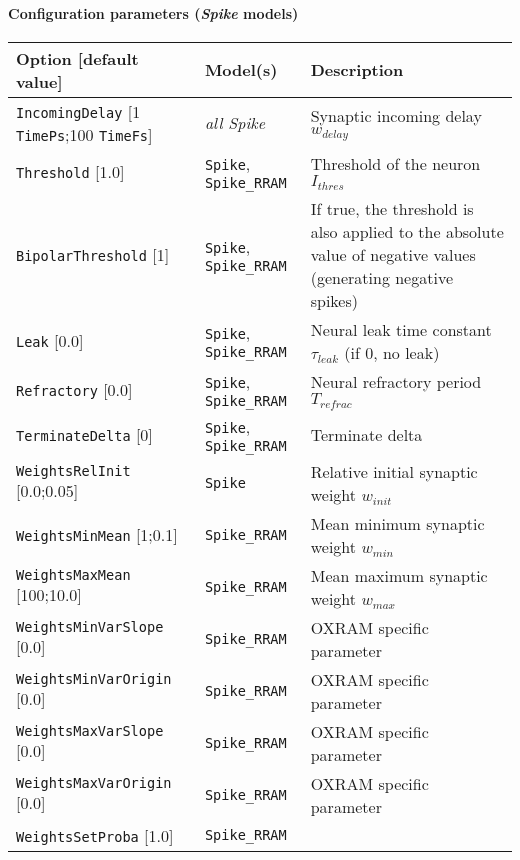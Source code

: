 \documentclass[a4paper,11pt,oneside]{article}
\begin{document}
\paragraph{Configuration parameters (\emph{Spike} models)}

\begin{center}
 \begin{longtable}{| p{4cm} | p{3cm} | p{9cm} | }
 \hline
 Option [default value] & Model(s) & Description\\
 \hline\hline
  \lstinline!IncomingDelay! [1 \lstinline!TimePs!;100 \lstinline!TimeFs!]
    & \emph{all Spike} & Synaptic incoming delay $w_{delay}$ \\
  \lstinline!Threshold! [1.0] & \lstinline!Spike!, \lstinline!Spike_RRAM!
    & Threshold of the neuron $I_{thres}$ \\
  \lstinline!BipolarThreshold! [1] & \lstinline!Spike!, \lstinline!Spike_RRAM!
    & If true, the threshold is also applied to the absolute value of negative
   values (generating negative spikes) \\
  \lstinline!Leak! [0.0] & \lstinline!Spike!, \lstinline!Spike_RRAM!
    & Neural leak time constant $\tau_{leak}$ (if 0, no leak) \\
  \lstinline!Refractory! [0.0] & \lstinline!Spike!, \lstinline!Spike_RRAM!
    & Neural refractory period $T_{refrac}$ \\
  \lstinline!TerminateDelta! [0] & \lstinline!Spike!, \lstinline!Spike_RRAM!
    & Terminate delta \\
  \lstinline!WeightsRelInit! [0.0;0.05] & \lstinline!Spike!
    & Relative initial synaptic weight $w_{init}$ \\
  \lstinline!WeightsMinMean! [1;0.1] & \lstinline!Spike_RRAM!
    & Mean minimum synaptic weight $w_{min}$ \\
  \lstinline!WeightsMaxMean! [100;10.0] & \lstinline!Spike_RRAM!
    & Mean maximum synaptic weight $w_{max}$ \\
  \lstinline!WeightsMinVarSlope! [0.0] & \lstinline!Spike_RRAM!
    & OXRAM specific parameter \\
  \lstinline!WeightsMinVarOrigin! [0.0] & \lstinline!Spike_RRAM!
    & OXRAM specific parameter \\
  \lstinline!WeightsMaxVarSlope! [0.0] & \lstinline!Spike_RRAM!
    & OXRAM specific parameter \\
  \lstinline!WeightsMaxVarOrigin! [0.0] & \lstinline!Spike_RRAM!
    & OXRAM specific parameter \\
  \lstinline!WeightsSetProba! [1.0] & \lstinline!Spike_RRAM!

\end{longtable}
\end{center}
\end{document}
